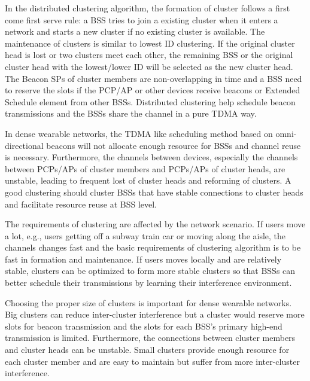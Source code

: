 \documentclass[10pt, conference, letterpaper]{IEEEtran}
\begin{document}
In the distributed clustering algorithm, the formation of cluster follows a first come first serve rule: a BSS tries to join a existing cluster when it enters a network and starts a new cluster if no existing cluster is available. The maintenance of clusters is similar to lowest ID clustering. If the original cluster head is lost or two clusters meet each other, the remaining BSS or the original cluster head with the lowest/lower ID will be selected as the new cluster head. The Beacon SPs of cluster members are non-overlapping in time and a BSS need to reserve the slots if the PCP/AP or other devices receive beacons or Extended Schedule element from other BSSs. Distributed clustering help schedule beacon transmissions and the BSSs share the channel in a pure TDMA way. 

In dense wearable networks, the TDMA like scheduling method based on omni-directional beacons will not allocate enough resource for BSSs and channel reuse is necessary. Furthermore, the channels between devices, especially the channels between PCPs/APs of cluster members and PCPs/APs of cluster heads, are unstable, leading to frequent lost of cluster heads and reforming of clusters. A good clustering should cluster BSSs that have stable connections to cluster heads and facilitate resource reuse at BSS level.

The requirements of clustering are affected by the network scenario. If users move a lot, e.g., users getting off a subway train car or moving along the aisle, the channels changes fast and the basic requirements of clustering algorithm is to be fast in formation and maintenance. If users moves locally and are relatively stable, clusters can be optimized to form more stable clusters so that BSSs can better schedule their transmissions by learning their interference environment. 

Choosing the proper size of clusters is important for dense wearable networks. Big clusters can reduce inter-cluster interference but a cluster would reserve more slots for beacon transmission and the slots for each BSS's primary high-end transmission is limited. Furthermore, the connections between cluster members and cluster heads can be unstable. 
Small clusters provide enough resource for each cluster member and are easy to maintain but suffer from more inter-cluster interference.
\end{document}
